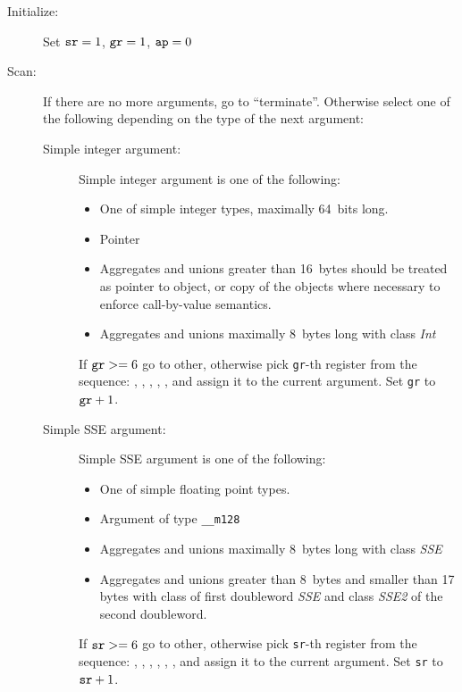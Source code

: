 \begin{description}
  \item[Initialize:]
    Set $\verb|sr|=1$, $\verb|gr|=1$, $\verb|ap|=0$


  \item[Scan:]
    If there are no more arguments, go to ``terminate''. Otherwise select one of the
    following depending on the type of the next argument:
      \begin{description}
        \item[Simple integer argument:]
          Simple integer argument is one of the following:
          \begin{itemize}
            \item One of simple integer types, maximally 64~bits long.
            \item Pointer
            \item Aggregates and unions greater than 16~bytes should be treated as
              pointer to object, or copy of the objects where necessary to enforce
              call-by-value semantics.
            \item Aggregates and unions maximally 8~bytes long with class \emph{Int}
          \end{itemize}
        If $\verb|gr| >= 6$ go to other, otherwise pick \verb|gr|-th register from
        the sequence: \RAX, \RDX, \RCX, \RBX, \RSI, \RDI{} and assign it to the current
        argument. Set \verb|gr| to $\verb|gr|+1$.


    \item[Simple SSE argument:]
      Simple SSE argument is one of the following:
      \begin{itemize}
        \item One of simple floating point types.
        \item Argument of type \verb|__m128|
        \item Aggregates and unions maximally 8~bytes long with class \emph{SSE}
        \item Aggregates and unions greater than 8~bytes and smaller
          than 17 bytes with class of first doubleword \emph{SSE}
          and class \emph{SSE2} of the second doubleword.
      \end{itemize}
      If $\verb|sr| >= 6$ go to other, otherwise pick \verb|sr|-th
      register from the sequence: , , ,
      , , ,  and assign it to
      the current argument.
      Set \verb|sr| to $\verb|sr|+1$.


\end{description}
\end{description}
